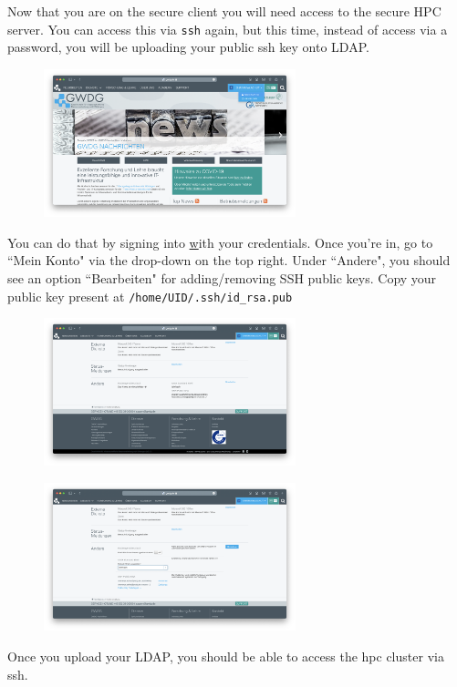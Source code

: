 \documentclass[paper=a4]{scrartcl}
\begin{document}
Now that you are on the secure client you will need access to the secure HPC server. 
You can access this via \texttt{ssh} again, but this time, instead of access via a password, you will be uploading your public ssh key onto LDAP.
\begin{figure}[!ht]
    \centerline{\includegraphics[width=0.65\textwidth]{gwdg1.png}}
    \caption{}
    \label{fig:screenshot1}
\end{figure}
You can do that by signing into \href{https://www.gwdg.de} with your credentials. 
Once you're in, go to ``Mein Konto" via the drop-down on the top right. Under ``Andere", you should see an option ``Bearbeiten" for adding/removing SSH public keys. 
Copy your public key present at \texttt{/home/UID/.ssh/id\_rsa.pub} 

\begin{figure}[!ht]
    \centerline{\includegraphics[width=0.65\textwidth]{gwdg2.png}}
    \caption{}
    \label{fig:screenshot2}
\end{figure}

\begin{figure}[!ht]
    \centerline{\includegraphics[width=0.65\textwidth]{gwdg3.png}}
    \caption{}
    \label{fig:screenshot3}
\end{figure}
Once you upload your LDAP, you should be able to access the hpc cluster via ssh. 
\end{document}
